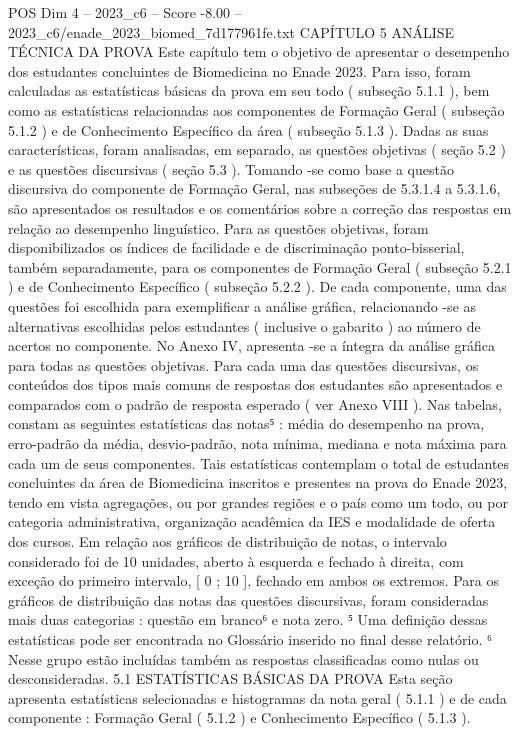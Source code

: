 \begin{textsample}{POS Dim 4 – 2023\_c6 – Score -8.00 – 2023\_c6/enade\_2023\_biomed\_7d177961fe.txt}  \label{ex:f4_pos_344}
CAPÍTULO 5 ANÁLISE TÉCNICA DA PROVA Este capítulo tem o objetivo de apresentar o desempenho dos estudantes concluintes de Biomedicina no Enade 2023.
Para isso, foram calculadas as estatísticas básicas da prova em seu todo ( subseção 5.1.1 ), bem como as estatísticas relacionadas aos componentes de Formação Geral ( subseção 5.1.2 ) e de Conhecimento Específico da área ( subseção 5.1.3 ).
Dadas as suas características, foram analisadas, em separado, as questões objetivas ( seção 5.2 ) e as questões discursivas ( seção 5.3 ).
Tomando -se como base a questão discursiva do componente de Formação Geral, nas subseções de 5.3.1.4 a 5.3.1.6, são apresentados os resultados e os comentários sobre a correção das respostas em relação ao desempenho linguístico.
Para as questões objetivas, foram disponibilizados os índices de facilidade e de discriminação ponto-bisserial, também separadamente, para os componentes de Formação Geral ( subseção 5.2.1 ) e de Conhecimento Específico ( subseção 5.2.2 ).
De cada componente, uma das questões foi escolhida para exemplificar a análise gráfica, relacionando -se as alternativas escolhidas pelos estudantes ( inclusive o gabarito ) ao número de acertos no componente.
No Anexo IV, apresenta -se a íntegra da análise gráfica para todas as questões objetivas.
Para cada uma das questões discursivas, os conteúdos dos tipos mais comuns de respostas dos estudantes são apresentados e comparados com o padrão de resposta esperado ( ver Anexo VIII ).
Nas tabelas, constam as seguintes estatísticas das notas⁵ : média do desempenho na prova, erro-padrão da média, desvio-padrão, nota mínima, mediana e nota máxima para cada um de seus componentes.
Tais estatísticas contemplam o total de estudantes concluintes da área de Biomedicina inscritos e presentes na prova do Enade 2023, tendo em vista agregações, ou por grandes regiões e o país como um todo, ou por categoria administrativa, organização acadêmica da IES e modalidade de oferta dos cursos.
Em relação aos gráficos de distribuição de notas, o intervalo considerado foi de 10 unidades, aberto à esquerda e fechado à direita, com exceção do primeiro intervalo, [ 0 ; 10 ], fechado em ambos os extremos.
Para os gráficos de distribuição das notas das questões discursivas, foram consideradas mais duas categorias : questão em branco⁶ e nota zero. ⁵ Uma definição dessas estatísticas pode ser encontrada no Glossário inserido no final desse relatório. ⁶ Nesse grupo estão incluídas também as respostas classificadas como nulas ou desconsideradas. 5.1 ESTATÍSTICAS BÁSICAS DA PROVA Esta seção apresenta estatísticas selecionadas e histogramas da nota geral ( 5.1.1 ) e de cada componente : Formação Geral ( 5.1.2 ) e Conhecimento Específico ( 5.1.3 ).

\end{textsample}
